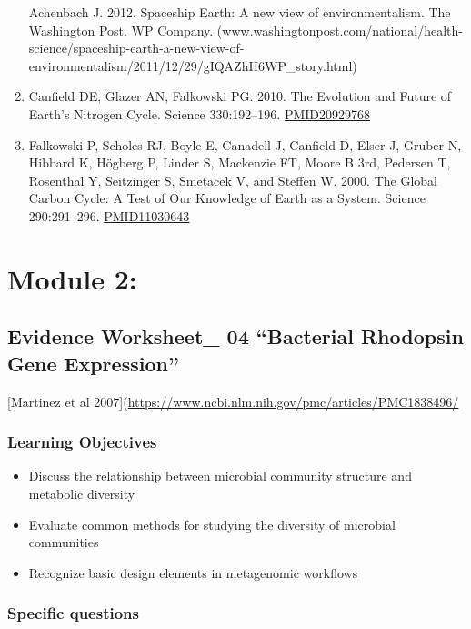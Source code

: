 \documentclass[]{article}
\begin{document}
\begin{enumerate}
  Achenbach J. 2012. Spaceship Earth: A new view of environmentalism.
  The Washington Post. WP Company.
  (www.washingtonpost.com/national/health-science/spaceship-earth-a-new-view-of-environmentalism/2011/12/29/gIQAZhH6WP\_story.html)
\item
  Canfield DE, Glazer AN, Falkowski PG. 2010. The Evolution and Future
  of Earth's Nitrogen Cycle. Science 330:192--196.
  \href{https://www.ncbi.nlm.nih.gov/pubmed/20929768}{PMID20929768}
\item
  Falkowski P, Scholes RJ, Boyle E, Canadell J, Canfield D, Elser J,
  Gruber N, Hibbard K, Högberg P, Linder S, Mackenzie FT, Moore B 3rd,
  Pedersen T, Rosenthal Y, Seitzinger S, Smetacek V, and Steffen W.
  2000. The Global Carbon Cycle: A Test of Our Knowledge of Earth as a
  System. Science 290:291--296.
  \href{https://www.ncbi.nlm.nih.gov/pubmed/11030643}{PMID11030643}
\end{enumerate}

\section{Module 2:}\label{module-2}

\subsection{\texorpdfstring{Evidence Worksheet\_ 04 ``Bacterial
Rhodopsin Gene
Expression''}{Evidence Worksheet\_ 04 Bacterial Rhodopsin Gene Expression}}\label{evidence-worksheet_-04-bacterial-rhodopsin-gene-expression}

{[}Martinez et al
2007{]}(\url{https://www.ncbi.nlm.nih.gov/pmc/articles/PMC1838496/}

\subsubsection{Learning Objectives}\label{learning-objectives-4}

\begin{itemize}
\item
  Discuss the relationship between microbial community structure and
  metabolic diversity
\item
  Evaluate common methods for studying the diversity of microbial
  communities
\item
  Recognize basic design elements in metagenomic workflows
\end{itemize}

\subsubsection{Specific questions}\label{specific-questions-3}
\end{document}
